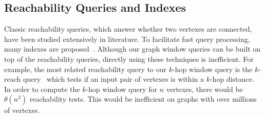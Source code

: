 %
%

\subsection{Reachability Queries and Indexes}
Classic reachability queries, which
answer whether two vertexes are connected, have 
been studied extensively in literature. 
To facilitate fast query processing, many indexes are
proposed~\cite{cheng2013tf,cheng2012k,wei2014reachability,yu2010graph}. 
Although our graph window queries
can be built on top of the reachability queries, directly
using these techniques is inefficient. For example, the
most related reachability
query to our $k$-hop window query is the $k$-reach query~\cite{cheng2012k} which
tests if an input pair of vertexes is within a $k$-hop distance. In order
to compute the $k$-hop window query for $n$ vertexes, there would be $\theta(n^2)$
reachability tests. This would be inefficient on graphs
with over millions of vertexes.

%

